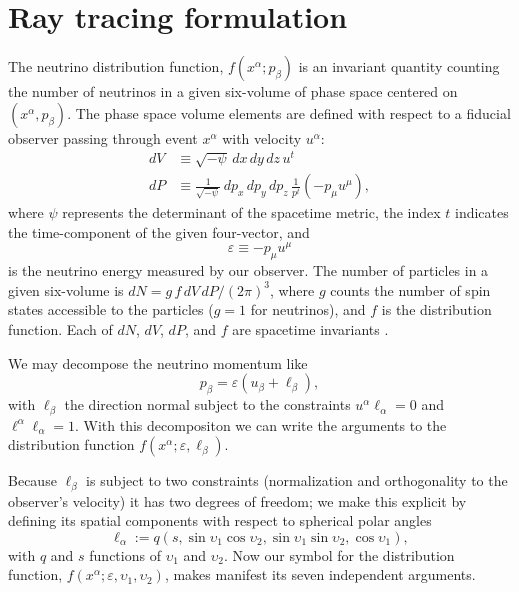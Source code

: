 \documentclass[aps,prd,twocolumn,superscriptaddress]{revtex4-1}
\begin{document}
\section{Ray tracing formulation}
\label{sec:formulation}
The neutrino distribution function, $f(x^\alpha; p_\beta)$ is an invariant
quantity counting the number of neutrinos in a given six-volume of phase
space centered on $(x^\alpha,p_\beta)$.
The phase space volume elements are defined with respect to a fiducial
observer passing through event $x^\alpha$ with velocity $u^\alpha$:
\begin{align}
  \label{eqn:dV}
  dV & \equiv \sqrt{-\psi} \, dx \, dy \, dz \, u^t \\
  \label{eqn:dP}
  dP & \equiv \frac{1}{\sqrt{-\psi}} \, dp_x \, dp_y \, dp_z \,
  \frac{1}{p^t}(-p_\mu u^\mu),
\end{align}
where $\psi$ represents the determinant of the spacetime metric,
the index $t$ indicates the time-component of the given four-vector, and
\begin{equation}
  \label{eqn:varepsilon}
  \varepsilon \equiv -p_\mu u^\mu
\end{equation}
is the neutrino energy measured by our observer.
The number of particles in a given six-volume is
$dN=g\,f\,dV\,dP/(2\pi)^3$,
where $g$ counts the number of spin states accessible to the
particles ($g=1$ for neutrinos), and $f$ is the distribution function.
Each of $dN$, $dV$, $dP$, and $f$ are spacetime invariants
\citep{debb2009-gr_boltzmann_1, debb2009-gr_boltzmann_2, lind1966-gr_boltzmann}.

We may decompose the neutrino momentum like
\begin{equation}
  \label{eqn:def_momentum}
  p_\beta = \varepsilon (u_\beta + \ell_\beta),
\end{equation}
with $\ell_\beta$ the direction normal subject to the constraints
$u^\alpha \ell_\alpha = 0$ and $\ell^\alpha \ell_\alpha=1$.
With this decompositon we can write the arguments to the distribution function
$f(x^\alpha;\varepsilon,\ell_\beta)$.

Because $\ell_\beta$ is subject to two constraints
(normalization and orthogonality to the observer's velocity)
it has two degrees of freedom; we make this explicit by defining its
spatial components with respect to spherical polar angles
\begin{equation}
  \label{eqn:def_direction}
  \ell_\alpha :=
  q (s,\sin\upsilon_1\cos\upsilon_2,\sin\upsilon_1\sin\upsilon_2,\cos\upsilon_1),
\end{equation}
with $q$ and $s$ functions of $\upsilon_1$ and $\upsilon_2$.
Now our symbol for the distribution function,
$f(x^\alpha;\varepsilon,\upsilon_1,\upsilon_2)$,
makes manifest its seven independent arguments.
\end{document}
